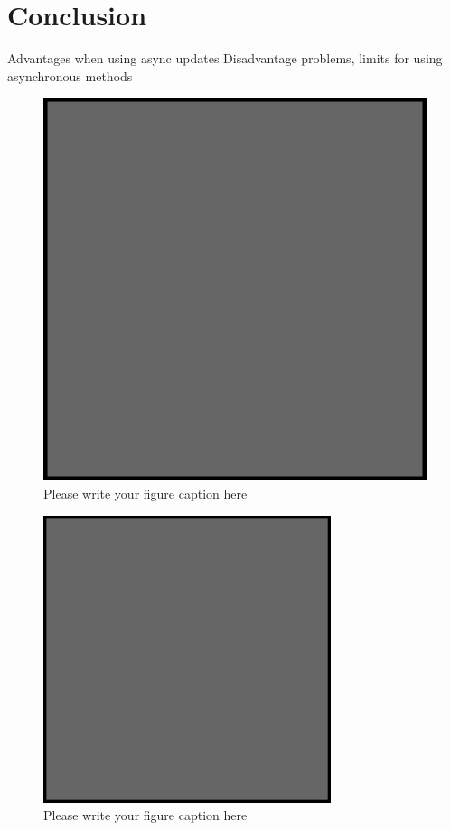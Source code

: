     \section{Conclusion}
Advantages when using async updates
Disadvantage problems, limits for using asynchronous methods
    \begin{figure}
        \includegraphics{example.eps}
        \caption{Please write your figure caption here}
        \label{fig:1}
    \end{figure}
    \begin{figure}
        \includegraphics[width=0.75\textwidth]{example.eps}
        \caption{Please write your figure caption here}
        \label{fig:2}
    \end{figure}
